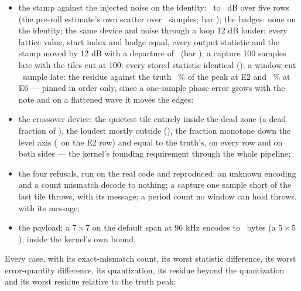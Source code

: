 \documentclass[11pt,a4paper]{article}
\begin{document}
{\begin{itemize}
  \item the stamp against the injected noise on the identity:
  \mparityStampScatterLow\ to \mparityStampScatterHigh\ dB over five rows
  (the pre-roll estimate's own scatter over \mparityStampSamples\
  samples; bar \mparityStamp); the badges: none on the identity; the same
  device and noise through a loop 12 dB louder: every lattice value,
  start index and badge equal, every output statistic and the stamp
  moved by 12 dB with a departure of \mparityGainShift\ (bar
  \mparityGain); a capture 100 samples late with the tiles cut at 100:
  every stored statistic identical (\mparityLatencyMove); a window cut
  \mparityMiscutSamples\ sample late: the residue against the truth
  \mparityMiscutLow\ \% of the peak at E2 and \mparityMiscutHigh\ \% at E6
  --- pinned in order only, since a one-sample phase error grows with the
  note and on a flattened wave it moves the edges:
  \begin{center}\small\mparityMiscutTable\end{center}
  \item the crossover device: the quietest tile entirely inside the dead
  zone (a dead fraction of \mparityDeadQuiet), the loudest mostly outside
  (\mparityDeadLoud), the fraction monotone down the level axis
  (\mparityDeadRow\ on the E2 row) and equal to the truth's, on every row
  and on both sides --- the kernel's founding requirement through the
  whole pipeline;
  \item the four refusals, run on the real code and reproduced: an
  unknown encoding and a count mismatch decode to nothing; a capture one
  sample short of the last tile throws, with its message; a period count
  no window can hold throws, with its message;
  \item the payload: a $7\times7$ on the default span at 96 kHz encodes
  to \mparityPayloadSeven\ bytes (a $5\times5$ \mparityPayloadFive),
  inside the kernel's own bound.
\end{itemize}
\par}
\mparityPartBStatus

Every case, with its exact-mismatch count, its worst statistic
difference, its worst error-quantity difference, its quantization, its
residue beyond the quantization and its worst residue relative to the
truth peak:

\begin{center}\scriptsize\setlength{\tabcolsep}{3pt}\mparityCaseTable\end{center}
\end{document}
